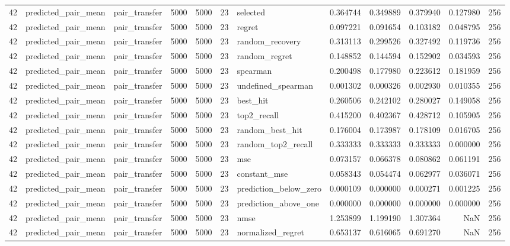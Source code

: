 \begin{tabular}{rllrrrlrrrrr}
42 & predicted_pair_mean & pair_transfer & 5000 & 5000 & 23 & selected & 0.364744 & 0.349889 & 0.379940 & 0.127980 & 256 \\
42 & predicted_pair_mean & pair_transfer & 5000 & 5000 & 23 & regret & 0.097221 & 0.091654 & 0.103182 & 0.048795 & 256 \\
42 & predicted_pair_mean & pair_transfer & 5000 & 5000 & 23 & random_recovery & 0.313113 & 0.299526 & 0.327492 & 0.119736 & 256 \\
42 & predicted_pair_mean & pair_transfer & 5000 & 5000 & 23 & random_regret & 0.148852 & 0.144594 & 0.152902 & 0.034593 & 256 \\
42 & predicted_pair_mean & pair_transfer & 5000 & 5000 & 23 & spearman & 0.200498 & 0.177980 & 0.223612 & 0.181959 & 256 \\
42 & predicted_pair_mean & pair_transfer & 5000 & 5000 & 23 & undefined_spearman & 0.001302 & 0.000326 & 0.002930 & 0.010355 & 256 \\
42 & predicted_pair_mean & pair_transfer & 5000 & 5000 & 23 & best_hit & 0.260506 & 0.242102 & 0.280027 & 0.149058 & 256 \\
42 & predicted_pair_mean & pair_transfer & 5000 & 5000 & 23 & top2_recall & 0.415200 & 0.402367 & 0.428712 & 0.105905 & 256 \\
42 & predicted_pair_mean & pair_transfer & 5000 & 5000 & 23 & random_best_hit & 0.176004 & 0.173987 & 0.178109 & 0.016705 & 256 \\
42 & predicted_pair_mean & pair_transfer & 5000 & 5000 & 23 & random_top2_recall & 0.333333 & 0.333333 & 0.333333 & 0.000000 & 256 \\
42 & predicted_pair_mean & pair_transfer & 5000 & 5000 & 23 & mse & 0.073157 & 0.066378 & 0.080862 & 0.061191 & 256 \\
42 & predicted_pair_mean & pair_transfer & 5000 & 5000 & 23 & constant_mse & 0.058343 & 0.054474 & 0.062977 & 0.036071 & 256 \\
42 & predicted_pair_mean & pair_transfer & 5000 & 5000 & 23 & prediction_below_zero & 0.000109 & 0.000000 & 0.000271 & 0.001225 & 256 \\
42 & predicted_pair_mean & pair_transfer & 5000 & 5000 & 23 & prediction_above_one & 0.000000 & 0.000000 & 0.000000 & 0.000000 & 256 \\
42 & predicted_pair_mean & pair_transfer & 5000 & 5000 & 23 & nmse & 1.253899 & 1.199190 & 1.307364 & NaN & 256 \\
42 & predicted_pair_mean & pair_transfer & 5000 & 5000 & 23 & normalized_regret & 0.653137 & 0.616065 & 0.691270 & NaN & 256 \\

\end{tabular}

